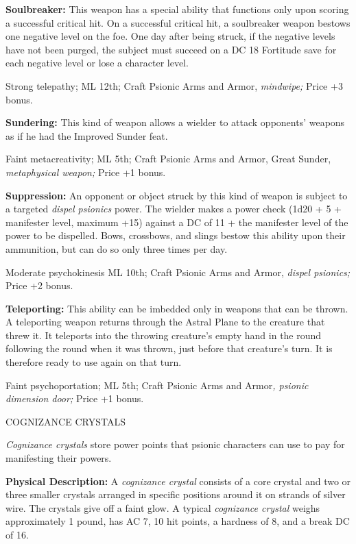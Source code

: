 \documentclass{article}
\begin{document}
\textbf{Soulbreaker:} This weapon has a special ability that functions only upon 
scoring a successful critical hit. On a successful critical hit, a soulbreaker 
weapon bestows one negative level on the foe. One day after being struck, if the 
negative levels have not been purged, the subject must succeed on a DC 18 Fortitude 
save for each negative level or lose a character level.

Strong telepathy; ML 12th; Craft Psionic Arms and Armor, \textit{mindwipe; }Price 
+3 bonus.

\textbf{Sundering: }This kind of weapon allows a wielder to attack opponents' weapons 
as if he had the Improved Sunder feat.

Faint metacreativity; ML 5th; Craft Psionic Arms and Armor, Great Sunder, \textit{metaphysical 
weapon; }Price +1 bonus.

\textbf{Suppression:} An opponent or object struck by this kind of weapon is subject 
to a targeted \textit{dispel psionics }power. The wielder makes a power check (1d20 
+ 5 + manifester level, maximum +15) against a DC of 11 + the manifester level 
of the power to be dispelled. Bows, crossbows, and slings bestow this ability upon 
their ammunition, but can do so only three times per day.

Moderate psychokinesis ML 10th; Craft Psionic Arms and Armor, \textit{dispel psionics; 
}Price +2 bonus.

\textbf{Teleporting:} This ability can be imbedded only in weapons that can be 
thrown. A teleporting weapon returns through the Astral Plane to the creature that 
threw it. It teleports into the throwing creature's empty hand in the round following 
the round when it was thrown, just before that creature's turn. It is therefore 
ready to use again on that turn.

Faint psychoportation; ML 5th; Craft Psionic Arms and Armor\textit{, psionic dimension 
door; }Price +1 bonus.

\vspace{12pt}
COGNIZANCE CRYSTALS

\textit{Cognizance crystals }store power points that psionic characters can use 
to pay for manifesting their powers.

\textbf{Physical Description: }A \textit{cognizance crystal }consists of a core 
crystal and two or three smaller crystals arranged in specific positions around 
it on strands of silver wire. The crystals give off a faint glow. A typical \textit{cognizance 
crystal }weighs approximately 1 pound, has AC 7, 10 hit points, a hardness of 8, 
and a break DC of 16.
\end{document}
